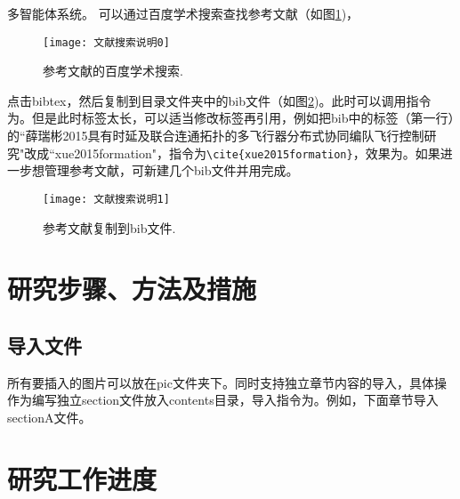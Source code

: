 \documentclass[course_p]{hdu-report}
\begin{document}
多智能体系统\citep{cao2011formation}。
可以通过百度学术搜索查找参考文献（如图\ref{fig_search0})，
 \begin{figure}[!htb]
  \centering
  \texttt{[image: 文献搜索说明0]}
  \caption{参考文献的百度学术搜索.}
  \label{fig_search0}
\end{figure}
点击bibtex，然后复制到目录文件夹中的bib文件（如图\ref{fig_search1})。此时可以调用指令为\citep{薛瑞彬2015具有时延及联合连通拓扑的多飞行器分布式协同编队飞行控制研究}。但是此时标签太长，可以适当修改标签再引用，例如把bib中的标签（第一行）的``薛瑞彬2015具有时延及联合连通拓扑的多飞行器分布式协同编队飞行控制研究"改成``xue2015formation"，指令为\verb+\cite{xue2015formation}+，效果为\cite{xue2015formation}。如果进一步想管理参考文献，可新建几个bib文件并用\verb++完成。
 \begin{figure}[!htb]
  \centering
  \texttt{[image: 文献搜索说明1]}
  \caption{参考文献复制到bib文件.}
  \label{fig_search1}
\end{figure}






\section{研究步骤、方法及措施}
\subsection{导入文件}
所有要插入的图片可以放在pic文件夹下。同时支持独立章节内容的导入，具体操作为编写独立section文件放入contents目录，导入指令为\verb++。例如，下面章节导入sectionA文件。





\section{研究工作进度}


\begin{table}[h]
\renewcommand\arraystretch{2.5}
\centering
{}
\end{table}
\end{document}
